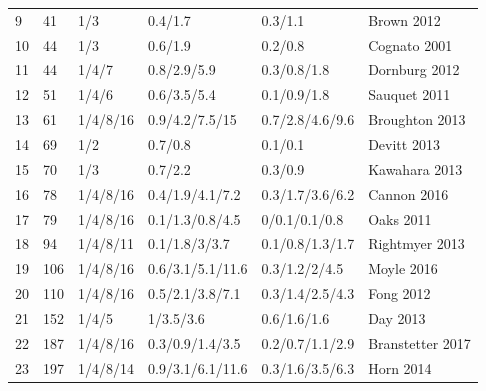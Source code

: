 \documentclass[10pt,letterpaper]{article}
\begin{document}
\begin{table}[h!]
\begin{tabular}{|l| l l l l l|}
9  &  41  &  1/3  &  0.4/1.7  &  0.3/1.1  &  Brown 2012 \cite{Brown_2012} \\ 

10  &  44  &  1/3  &  0.6/1.9  &  0.2/0.8  &  Cognato 2001 \cite{Cognato_2001} \\ 

11  &  44  &  1/4/7  &  0.8/2.9/5.9  &  0.3/0.8/1.8  &  Dornburg 2012 \cite{Dornburg_2012} \\ 

12  &  51  &  1/4/6  &  0.6/3.5/5.4  &  0.1/0.9/1.8  &  Sauquet 2011 \cite{Sauquet_2011} \\ 

13  &  61  &  1/4/8/16  &  0.9/4.2/7.5/15  &  0.7/2.8/4.6/9.6  &  Broughton 2013 \cite{Broughton_2013} \\ 

14  &  69  &  1/2  &  0.7/0.8  &  0.1/0.1  &  Devitt 2013 \cite{Devitt_2013} \\ 

15  &  70  &  1/3  &  0.7/2.2  &  0.3/0.9  &  Kawahara 2013 \cite{Kawahara_2013} \\ 

16  &  78  &  1/4/8/16  &  0.4/1.9/4.1/7.2  &  0.3/1.7/3.6/6.2  &  Cannon 2016 \cite{Cannon_2016} \\ 

17  &  79  &  1/4/8/16  &  0.1/1.3/0.8/4.5  &  0/0.1/0.1/0.8  &  Oaks 2011 \cite{Oaks_2011} \\ 

18  &  94  &  1/4/8/11  &  0.1/1.8/3/3.7  &  0.1/0.8/1.3/1.7  &  Rightmyer 2013 \cite{Rightmyer_2013} \\ 

19  &  106  &  1/4/8/16  &  0.6/3.1/5.1/11.6  &  0.3/1.2/2/4.5  &  Moyle 2016 \cite{Moyle_2016} \\ 

20  &  110  &  1/4/8/16  &  0.5/2.1/3.8/7.1  &  0.3/1.4/2.5/4.3  &  Fong 2012 \cite{Fong_2012} \\ 

21  &  152  &  1/4/5  &  1/3.5/3.6  &  0.6/1.6/1.6  &  Day 2013 \cite{Day_2013} \\ 

22  &  187  &  1/4/8/16  &  0.3/0.9/1.4/3.5  &  0.2/0.7/1.1/2.9  &  Branstetter 2017 \cite{Branstetter_2017} \\ 

23  &  197  &  1/4/8/14  &  0.9/3.1/6.1/11.6  &  0.3/1.6/3.5/6.3  &  Horn 2014 \cite{Horn_2014} \\ 


\end{tabular}
\end{table}
\end{document}
